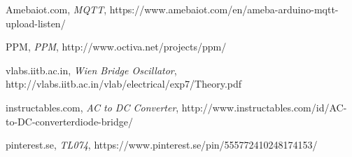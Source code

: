 \documentclass[a4paper,12pt,oneside]{article}
\begin{document}
\begin{thebibliography}{80}
 Amebaiot.com,
\textit{MQTT}, https://www.amebaiot.com/en/ameba-arduino-mqtt-upload-listen/
		
 PPM,
\textit{PPM}, http://www.octiva.net/projects/ppm/

 vlabs.iitb.ac.in,
\textit{Wien Bridge Oscillator}, http://vlabs.iitb.ac.in/vlab/electrical/exp7/Theory.pdf

 instructables.com,
\textit{AC to DC Converter}, http://www.instructables.com/id/AC-to-DC-converterdiode-bridge/

 pinterest.se,
\textit{TL074}, https://www.pinterest.se/pin/555772410248174153/

\end{thebibliography}
\end{document}
